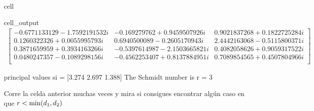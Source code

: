 \documentclass[letterpaper,10pt,english]{jupyterBook}
\begin{document}
\begin{sphinxuseclass}{cell}
\begin{sphinxVerbatimOutput}
\begin{sphinxuseclass}{cell_output}\begin{equation*}
\begin{split}\begin{bmatrix}
-0.6771133129 - 1.7592191532 i & -0.169279762 + 0.9459507926 i & 0.9021837268 + 0.1822725284 i  \\
 0.1260322326 + 0.0055995793 i & 0.6940500089 - 0.2605170943 i & 2.4442163068 - 0.5115800371 i  \\
 0.3871659959 + 0.3934163266 i & -0.5397614987 - 2.1503665821 i & 0.4082058626 + 0.9059317522 i  \\
 0.0480247357 - 0.1089298156 i & -0.4562253407 + 0.8137884951 i & 0.7089854565 + 0.4507804966 i  \\
 \end{bmatrix}
\end{split}
\end{equation*}
\begin{sphinxVerbatim}[commandchars=\\\{\}]
principal values s\PYGZus{}i =  [3.274 2.697 1.388]
The Schmidt number is r = 3
\end{sphinxVerbatim}

\end{sphinxuseclass}\end{sphinxVerbatimOutput}

\end{sphinxuseclass}
\sphinxAtStartPar
Corre la celda anterior muchas veces y mira si consigues encontrar algún caso en que \(r<{\rm min}(d_1,d_2)\)
\end{document}

